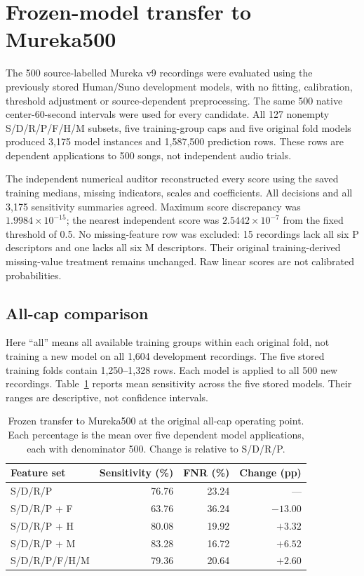 \section{Frozen-model transfer to Mureka500}
\label{sec:mureka-frozen-transfer}

The 500 source-labelled Mureka v9 recordings were evaluated using the
previously stored Human/Suno development models, with no fitting, calibration,
threshold adjustment or source-dependent preprocessing. The same 500 native
center-60-second intervals were used for every candidate. All 127 nonempty
S/D/R/P/F/H/M subsets, five training-group caps and five original fold models
produced 3,175 model instances and 1,587,500 prediction rows. These rows are
dependent applications to 500 songs, not independent audio trials.

The independent numerical auditor reconstructed every score using the saved
training medians, missing indicators, scales and coefficients. All decisions
and all 3,175 sensitivity summaries agreed. Maximum score discrepancy was
$1.9984\times10^{-15}$; the nearest independent score was
$2.5442\times10^{-7}$ from the fixed threshold of 0.5. No missing-feature row
was excluded: 15 recordings lack all six P descriptors and one lacks all six
M descriptors. Their original training-derived missing-value treatment remains
unchanged. Raw linear scores are not calibrated probabilities.

\subsection{All-cap comparison}
Here ``all'' means all available training groups within each original fold,
not training a new model on all 1,604 development recordings. The five stored
training folds contain 1,250--1,328 rows. Each model is applied to all 500 new
recordings. Table~\ref{tab:mureka-main} reports mean sensitivity across the
five stored models. Their ranges are descriptive, not confidence intervals.

\begin{table}[htbp]
\centering\small
\begin{tabular}{lrrr}
\hline
Feature set & Sensitivity (\%) & FNR (\%) & Change (pp)\\
\hline
S/D/R/P & 76.76 & 23.24 & ---\\
S/D/R/P + F & 63.76 & 36.24 & $-13.00$\\
S/D/R/P + H & 80.08 & 19.92 & $+3.32$\\
S/D/R/P + M & 83.28 & 16.72 & $+6.52$\\
S/D/R/P/F/H/M & 79.36 & 20.64 & $+2.60$\\
\hline
\end{tabular}
\caption{Frozen transfer to Mureka500 at the original all-cap operating point.
Each percentage is the mean over five dependent model applications, each with
denominator 500. Change is relative to S/D/R/P.}
\label{tab:mureka-main}
\end{table}

